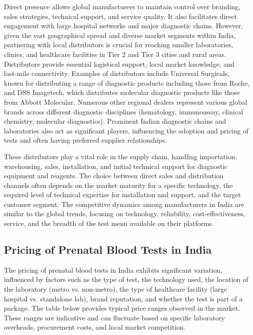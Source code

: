 \documentclass{article}
\begin{document}
Direct presence allows global manufacturers to maintain control over branding, sales strategies, technical support, and service quality. It also facilitates direct engagement with large hospital networks and major diagnostic chains. However, given the vast geographical spread and diverse market segments within India, partnering with local distributors is crucial for reaching smaller laboratories, clinics, and healthcare facilities in Tier 2 and Tier 3 cities and rural areas. Distributors provide essential logistical support, local market knowledge, and last-mile connectivity. Examples of distributors include Universal Surgicals, known for distributing a range of diagnostic products including those from Roche, and DSS Imagetech, which distributes molecular diagnostic products like those from Abbott Molecular. Numerous other regional dealers represent various global brands across different diagnostic disciplines (hematology, immunoassay, clinical chemistry, molecular diagnostics). Prominent Indian diagnostic chains and laboratories also act as significant players, influencing the adoption and pricing of tests and often having preferred supplier relationships.

These distributors play a vital role in the supply chain, handling importation, warehousing, sales, installation, and initial technical support for diagnostic equipment and reagents. The choice between direct sales and distribution channels often depends on the market maturity for a specific technology, the required level of technical expertise for installation and support, and the target customer segment. The competitive dynamics among manufacturers in India are similar to the global trends, focusing on technology, reliability, cost-effectiveness, service, and the breadth of the test menu available on their platforms.

\subsection{Pricing of Prenatal Blood Tests in India}

The pricing of prenatal blood tests in India exhibits significant variation, influenced by factors such as the type of test, the technology used, the location of the laboratory (metro vs. non-metro), the type of healthcare facility (large hospital vs. standalone lab), brand reputation, and whether the test is part of a package. The table below provides typical price ranges observed in the market. These ranges are indicative and can fluctuate based on specific laboratory overheads, procurement costs, and local market competition.
\end{document}
